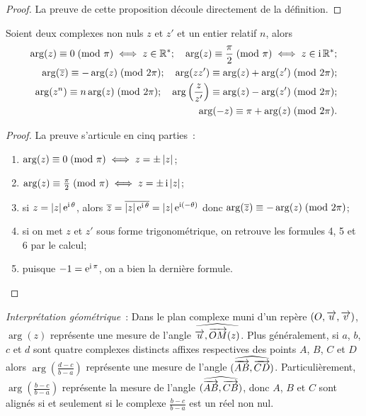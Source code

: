 \begin{proof}
    La preuve de cette proposition découle directement de la définition.
\end{proof}

\begin{prop}
    Soient deux complexes non nuls \(z\) et \(z'\) et un entier relatif \(n\), 
    alors
    \begin{align*}
        \arg(z) \equiv 0\!\pmod {\pi} \iff z \in \mathbb{R}^*; \quad 
        \arg(z) \equiv \frac{\pi}{2}\!\pmod {\pi} \iff z \in \operatorname{i}\mathbb{R}^{*};\\
        \arg(\overline{z}) \equiv -\arg(z)\!\pmod {2\pi}; \quad \arg(z 
        z') \equiv \arg(z) + \arg(z')\!\pmod {2\pi}; \\
        \arg(z^n) \equiv n \arg(z)\!\pmod {2\pi}; \quad \arg 
        \left(\frac{z}{z'} \right) \equiv \arg(z) - \arg(z') \!\pmod {2\pi}; \\
        \arg(-z) \equiv \pi + \arg(z)\!\pmod {2\pi}.
    \end{align*}
\end{prop}

\begin{proof}
    La preuve s'articule en cinq parties~:
    \begin{enumerate}
        \item \(\arg(z) \equiv 0\!\pmod {\pi} \iff z = \pm \left\lvert z\right\rvert\);
        \item \(\arg(z) \equiv \frac{\pi}{2}\!\pmod {\pi} \iff z = \pm \operatorname{i} \left\lvert z\right\rvert\);
        \item si \(z = \left\lvert z\right\rvert \operatorname{e}^{\operatorname{i} \theta}\), alors \(\overline{z} = 
            \overline{|z| \operatorname{e}^{\operatorname{i} \theta}} = |z| \operatorname{e}^{\operatorname{i} (-\theta)}\) donc 
            \(\arg(\overline{z}) \equiv -\arg(z)\!\pmod {2\pi}\);
        \item si on met \(z\) et \(z'\) sous forme trigonométrique, on retrouve 
            les formules 4, 5 et 6 par le calcul;
        \item puisque \(-1 = \operatorname{e}^{\operatorname{i} \pi}\), on a bien la dernière formule.
    \end{enumerate}
\end{proof}

\emph{Interprétation géométrique}~: Dans le plan complexe muni d'un repère 
\((O,\overrightarrow{u}, \overrightarrow{v})\), \(\arg(z)\) représente une mesure de l'angle 
\(\widehat{\overrightarrow{u}, \overrightarrow{OM}(z)}\). Plus généralement, si \(a\), \(b\), \(c\) 
et \(d\) sont quatre complexes distincts affixes respectives des points \(A\), 
\(B\), \(C\) et \(D\) alors \(\arg\left(\frac{d-c}{b-a}\right)\) représente une 
mesure de l'angle \((\widehat{\overrightarrow{AB},\overrightarrow{CD}})\). Particulièrement, 
\(\arg\left(\frac{b-c}{b-a}\right)\) représente la mesure de l'angle 
\((\widehat{\overrightarrow{AB},\overrightarrow{CB}})\), donc \(A\), \(B\) et \(C\) sont alignés si 
et seulement si le complexe \(\frac{b-c}{b-a}\) est un réel non nul.

